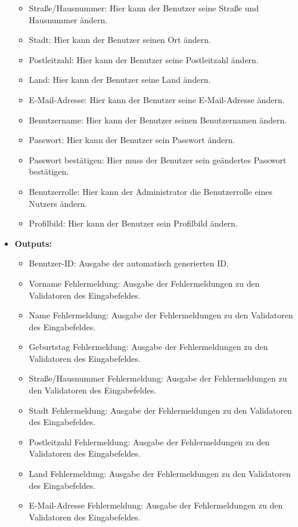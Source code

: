 \begin{itemize}
\begin{itemize}
								\item Straße/Hausnummer: Hier kann der Benutzer seine Straße und Hausnummer ändern.
								\item Stadt: Hier kann der Benutzer seinen Ort ändern.
								\item Postleitzahl: Hier kann der Benutzer seine Postleitzahl ändern.
								\item Land: Hier kann der Benutzer seine Land ändern.
								\item E-Mail-Adresse: Hier kann der Benutzer seine E-Mail-Adresse ändern.
								\item Benutzername: Hier kann der Benutzer seinen Benutzernamen ändern.
								\item Passwort: Hier kann der Benutzer sein Passwort ändern.
								\item Passwort bestätigen: Hier muss der Benutzer sein geändertes Passwort bestätigen.
								\item Benutzerrolle: Hier kann der Administrator die Benutzerrolle eines Nutzers ändern.
								\item Profilbild: Hier kann der Benutzer sein Profilbild ändern.
							\end{itemize}
						\item \textbf{Outputs:}
							\begin{itemize}
								\item Benutzer-ID: Ausgabe der automatisch generierten ID.
								\item Vorname Fehlermeldung: Ausgabe der Fehlermeldungen zu den Validatoren des Eingabefeldes.
								\item Name Fehlermeldung: Ausgabe der Fehlermeldungen zu den Validatoren des Eingabefeldes.
								\item Geburtstag Fehlermeldung: Ausgabe der Fehlermeldungen zu den Validatoren des Eingabefeldes.
								\item Straße/Hausnummer Fehlermeldung: Ausgabe der Fehlermeldungen zu den Validatoren des Eingabefeldes.
								\item Stadt Fehlermeldung: Ausgabe der Fehlermeldungen zu den Validatoren des Eingabefeldes.
								\item Postleitzahl Fehlermeldung: Ausgabe der Fehlermeldungen zu den Validatoren des Eingabefeldes.
								\item Land Fehlermeldung: Ausgabe der Fehlermeldungen zu den Validatoren des Eingabefeldes.
								\item E-Mail-Adresse Fehlermeldung: Ausgabe der Fehlermeldungen zu den Validatoren des Eingabefeldes.

\end{itemize}
\end{itemize}

